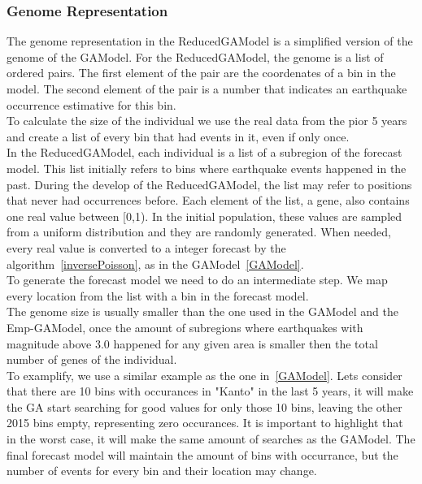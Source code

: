 \subsubsection{Genome Representation}\label{genomeReduced}
The genome representation in the ReducedGAModel is a simplified version of the genome of the GAModel. For the ReducedGAModel, the genome is a list of ordered pairs. The first element of the pair are the coordenates of a bin in the model. The second element of the pair is a number that indicates an earthquake occurrence estimative for this bin.\\

To calculate the size of the individual we use the real data from the pior 5 years and create a list of every bin that had events in it, even if only once.\\

In the ReducedGAModel, each individual is a list of a subregion of the forecast model. This list initially refers to bins where earthquake events happened in the past. During the develop of the ReducedGAModel, the list may refer to positions that never had occurrences before. Each element of the list, a gene, also contains one real value between [0,1). In the initial population, these values are sampled from a uniform distribution and they are randomly generated. When needed, every real value is converted to a integer forecast by the algorithm~\ref{inversePoisson}, as in the GAModel~\ref{GAModel}.\\

To generate the forecast model we need to do an intermediate step. We map every location from the list with a bin in the forecast model.\\

The genome size is usually smaller than the one used in the GAModel and the Emp-GAModel, once the amount of subregions where earthquakes with magnitude above 3.0 happened for any given area is smaller then the total number of genes of the individual.\\

To examplify, we use a similar example as the one in~\ref{GAModel}. Lets consider that there are 10 bins with occurances in "Kanto" in the last 5 years, it will make the GA start searching for good values for only those 10 bins, leaving the other 2015 bins empty, representing zero occurances. It is important to highlight that in the worst case, it will make the same amount of searches as the GAModel. The final forecast model will maintain the amount of bins with occurrance, but the number of events for every bin and their location may change.\\

